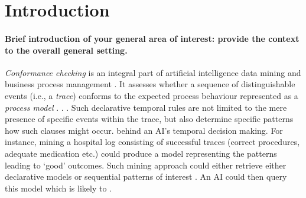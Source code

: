 \section{Introduction}

\paragraph*{Brief introduction of your general area of interest: provide the \textbf{context} to the overall general setting.} \textit{Conformance checking} is an integral part of artificial intelligence  data mining and business process management \cite{bpm21}. It assesses whether a sequence of distinguishable events (i.e., a \textit{trace}) conforms to the expected process behaviour represented as a \textit{process model} \cite{RozinatA08}.  \cite{Li2020}  \cite{AgostinelliBFMM21}. %
 \cite{bpm21}. Such declarative temporal rules are not limited to the mere presence of specific events within the trace, but also determine specific patterns how such clauses might occur.   behind an AI's temporal decision making.  For instance, mining a hospital log consisting of successful traces (correct procedures, adequate medication etc.) could produce a model representing the patterns leading to `good' outcomes. Such mining approach could either retrieve either declarative models or sequential patterns of interest \cite{mining}. An AI could then query this model  which  is likely to .



